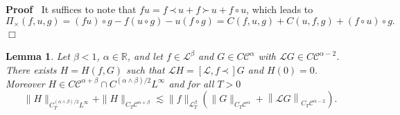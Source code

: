 \documentclass[a4paper,11pt]{article}
\newenvironment{proof}{\noindent\textbf{Proof\ }}{\hspace*{\fill}$\Box$\medskip}
\newtheorem{lemma}{Lemma}
{\theorembodyfont{\rmfamily}\newtheorem{remark}{Remark}}
\newcommand{\LL}{\mathscr{L}}
\newcommand{\CC}{\mathscr{C}}
\newcommand{\lpara}{\,\mathord{\prec}\,}
\newcommand{\rpara}{\,\mathord{\succ}\,}
\newcommand{\reso}{\,\mathord{\circ}\,}
\begin{document}
\begin{proof}
  It suffices to note that $fu = f \lpara u + f \rpara u + f \reso u$, which
  leads to
  \[ \Pi_{\times} (f, u, g) = (fu) \reso g - f (u \reso g) - u (f \reso g) = C
     (f, u, g) + C (u, f, g) + (f \reso u) \reso g. \]
\end{proof}

\begin{lemma}
  \label{lemma:comm-L-para}Let $\beta < 1$, $\alpha \in \mathbb{R}$, and let
  $f \in \LL^{\beta}$ and $G \in C \CC^{\alpha}$ with $\LL G \in C \CC^{\alpha
  - 2}$. There exists $H = H (f, G)$ such that $\LL H = [ \LL, f \lpara
  ] G$ and $H (0) = 0$. Moreover $H \in C \CC^{\alpha + \beta} \cap
  C^{(\alpha \wedge \beta) / 2} L^{\infty}$ and for all $T > 0$
  \[ \| H \|_{C^{(\alpha \wedge \beta) / 2}_T L^{\infty}} + \| H \|_{C_T
     \CC^{\alpha + \beta}} \lesssim \| f \|_{\LL^{\beta}_T} ( \| G
     \|_{C_T \CC^{\alpha}} + \left\| \LL G \right\|_{C_T \CC^{\alpha - 2}}) . \]
\end{lemma}
\end{document}
